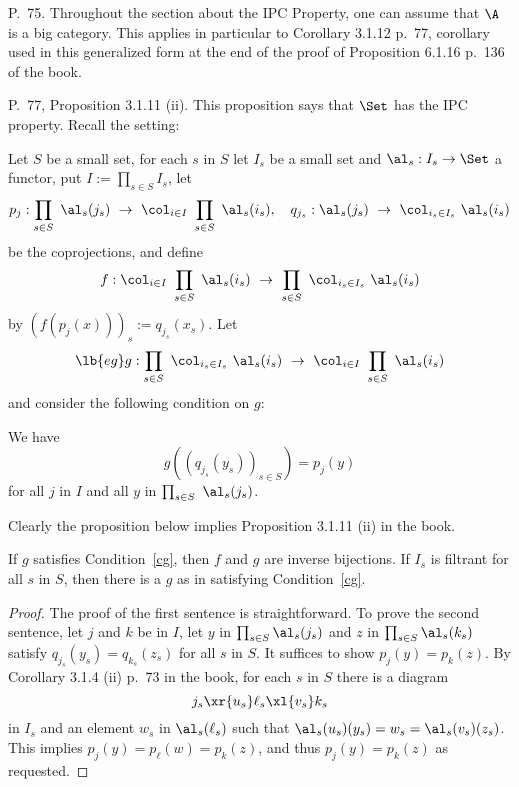 \documentclass[12pt]{article}
\theoremstyle{remark}
\theoremstyle{definition}
\begin{document}
%

\begin{s}
P.~75. Throughout the section about the IPC Property, one can assume that $\A$ is a big category. This applies in particular to Corollary 3.1.12 p.~77, corollary used in this generalized form at the end of the proof of Proposition 6.1.16 p.~136 of the book.
\end{s}

%

\begin{s}
P.~77, Proposition 3.1.11 (ii). This proposition says that $\Set$ has the IPC property. Recall the setting:

Let $S$ be a small set, for each $s$ in $S$ let $I_s$ be a small set and $\al_s:I_s\to\Set$ a functor, put $I:=\prod_{s\in S}I_s$, let 
$$
p_j:\prod_{s\in S}\ \al_s(j_s)\ \to\ \col_{i\in I}\ \prod_{s\in S}\ \al_s(i_s),\quad q_{j_s}:\al_s(j_s)\ \to\ \col_{i_s\in I_s}\ \al_s(i_s)
$$ 
be the coprojections, and define  
$$
f:\col_{i\in I}\ \prod_{s\in S}\ \al_s(i_s)\ \to\ \prod_{s\in S}\ \col_{i_s\in I_s}\ \al_s(i_s)
$$ 
by $(f(p_j(x)))_s:=q_{j_s}(x_s)$. Let 
\begin{equation}\lb{eg}
g:\prod_{s\in S}\ \col_{i_s\in I_s}\ \al_s(i_s)\ \to\ \col_{i\in I}\ \prod_{s\in S}\ \al_s(i_s)
\end{equation} 
and consider the following condition on $g$:
\begin{cond} 
We have 
$$
g((q_{j_s}(y_s))_{s\in S})=p_j(y)
$$ 
for all $j$ in $I$ and all $y$ in $\prod_{s\in S}\ \al_s(j_s)$.
\end{cond} 

Clearly the proposition below implies Proposition 3.1.11 (ii) in the book.

\begin{prop}
If $g$ satisfies Condition~\ref{cg}, then $f$ and $g$ are inverse bijections. If $I_s$ is filtrant for all $s$ in $S$, then there is a $g$ as in  satisfying Condition~\ref{cg}.
\end{prop} 
\begin{proof}
The proof of the first sentence is straightforward. To prove the second sentence, let $j$ and $k$ be in $I$, let $y$ in $\prod_{s\in S}\al_s(j_s)$ and $z$ in $\prod_{s\in S}\al_s(k_s)$ satisfy $q_{j_s}(y_s)=q_{k_s}(z_s)$ for all $s$ in $S$. It suffices to show $p_j(y)=p_k(z)$. By Corollary 3.1.4 (ii) p.~73 in the book, for each $s$ in $S$ there is a diagram 
$$
j_s\xr{u_s}\ell_s\xl{v_s}k_s
$$ 
in $I_s$ and an element $w_s$ in $\al_s(\ell_s)$ such that $\al_s(u_s)(y_s)=w_s=\al_s(v_s)(z_s)$. This implies $p_j(y)=p_\ell(w)=p_k(z)$, and thus $p_j(y)=p_k(z)$ as requested.
\end{proof}


\end{s}
\end{document}

